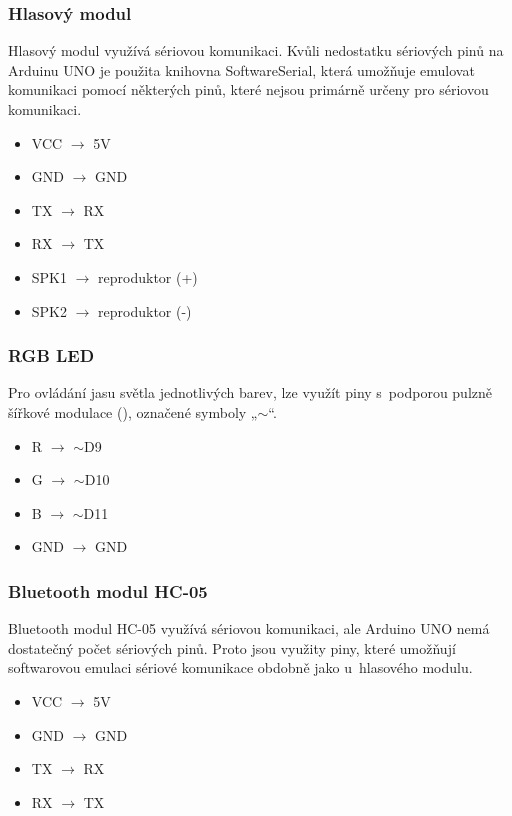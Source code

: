 \subsubsection*{Hlasový modul}
Hlasový modul využívá sériovou komunikaci. Kvůli nedostatku sériových pinů na Arduinu UNO je použita knihovna SoftwareSerial, která umožňuje emulovat  komunikaci pomocí některých pinů, které nejsou primárně určeny pro sériovou komu\-nikaci.
\begin{itemize}
    \tiny
    \setlength{\itemsep}{0pt} 
    \item VCC $\rightarrow$ 5V 
    \item GND $\rightarrow$ GND
    \item TX  $\rightarrow$ RX 
    \item RX  $\rightarrow$ TX
    \item SPK1 $\rightarrow$ reproduktor (+)
    \item SPK2 $\rightarrow$ reproduktor (-)
\end{itemize}

\subsubsection*{RGB LED}
Pro ovládání jasu světla jednotlivých barev, lze využít piny s~podporou pulzně šířkové modulace (), označené symboly „\(\sim \)“.
\begin{itemize}
    \tiny
    \setlength{\itemsep}{0pt} 
    \item R $\rightarrow$ \(\sim \)D9
    \item G $\rightarrow$ \(\sim \)D10
    \item B $\rightarrow$ \(\sim \)D11
    \item GND $\rightarrow$ GND
\end{itemize}

\subsubsection*{Bluetooth modul HC-05}
Bluetooth modul HC-05 využívá sériovou komunikaci, ale Arduino UNO nemá dosta\-tečný počet sériových pinů. Proto jsou využity piny, které umožňují softwarovou emulaci sériové komunikace obdobně jako u~hlasového modulu.
\begin{itemize}
    \tiny
    \setlength{\itemsep}{0pt} 
    \item VCC $\rightarrow$ 5V 
    \item GND $\rightarrow$ GND
    \item TX  $\rightarrow$ RX 
    \item RX  $\rightarrow$ TX 
\end{itemize}

